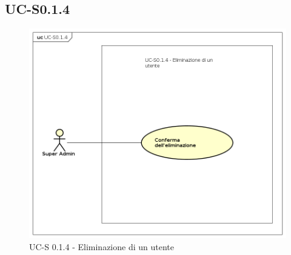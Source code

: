 \subsection{UC-S0.1.4}
    \begin{figure}[H]
      \begin{center}
        \includegraphics[width=12cm]{res/img/UCSuperadmin/UCS0.1.4.png}
      \caption{UC-S 0.1.4 - Eliminazione di un utente}
      \end{center} 
    \end{figure}    
    
